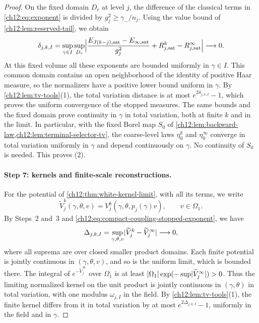 \begin{proof}
On the fixed domain $D_r$ at level $j$, the difference of the classical terms in \eqref{ch12:eq:exponent} is divided by $g_j^2\ge\gamma_-/n_j$. Using the value bound of \cref{ch12:lem:reserved-tail}, we obtain
\begin{equation}\label{ch12:eq:compact-coupling-stopped-exponent}
 \delta_{j,k,I}=\sup_{\gamma\in I}\sup_{D_r}\Bigl\lvert\frac{E_{J(k-j),\mathrm{sat}}-E_{\infty,\mathrm{sat}}}{g_j^2}+R_{j,\mathrm{sat}}^k-R_{j,\mathrm{sat}}^\infty\Bigr\rvert\longrightarrow0 .
\end{equation}
At this fixed volume all these exponents are bounded uniformly in $\gamma\in I$. This common domain contains an open neighborhood of the identity of positive Haar measure, so the normalizers have a positive lower bound uniform in $\gamma$. By \cref{ch12:lem:tv-tools}(1), the total variation distance is at most $e^{2\delta_{j,k,I}}-1$, which proves the uniform convergence of the stopped measures. The same bounds and the fixed domain prove continuity in $\gamma$ in total variation, both at finite $k$ and in the limit. In particular, with the fixed Borel map $S_0$ of \cref{ch12:lem:backward-law,ch12:lem:terminal-selector-tv}, the coarse-level laws $\eta_0^k$ and $\eta_0^\infty$ converge in total variation uniformly in $\gamma$ and depend continuously on $\gamma$. No continuity of $S_0$ is needed. This proves (2).

\paragraph{Step 7: kernels and finite-scale reconstructions.}
For the potential of \cref{ch12:thm:white-kernel-limit}, with all its terms, we write
\[
 \widetilde V_j^k(\gamma,\theta,v)=V_j^k(\gamma,\theta,p_j(\gamma)v),\qquad v\in\Omega_1 .
\]
By Steps~2 and~3 and \eqref{ch12:eq:compact-coupling-stopped-exponent}, we have
\begin{equation}\label{ch12:eq:compact-coupling-kernel-potential}
 \Delta_{j,k,I}=\sup_{\gamma,\theta,v}\lvert \widetilde V_j^k-\widetilde V_j^\infty\rvert\longrightarrow0 ,
\end{equation}
where all suprema are over closed smaller product domains. Each finite potential is jointly continuous in $(\gamma,\theta,v)$, and so is the uniform limit, which is bounded there. The integral of $e^{-\widetilde V_j^\infty}$ over $\Omega_1$ is at least $\lvert \Omega_1\rvert\exp(-\sup\lvert \widetilde V_j^\infty\rvert)>0$. Thus the limiting normalized kernel on the unit product is jointly continuous in $(\gamma,\theta)$ in total variation, with one modulus $\omega_{j,I}$ in the field. By \cref{ch12:lem:tv-tools}(1), the finite kernel differs from it in total variation by at most $e^{2\Delta_{j,k,I}}-1$, uniformly in the field and in $\gamma$.


\end{proof}
